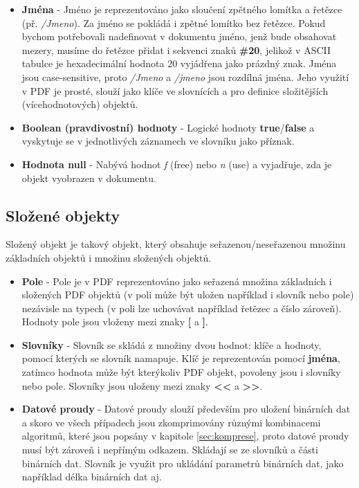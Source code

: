 \begin{itemize}
		\item \textbf{Jména} - Jméno je reprezentováno jako sloučení zpětného lomítka a řetězce (př. \textit{/Jmeno}). Za jméno se pokládá i zpětné lomítko bez řetězce. Pokud bychom potřebovali nadefinovat v dokumentu jméno, jenž bude obsahovat mezery, musíme do řetězce přidat i sekvenci znaků \textbf{\#20}, jelikož v ASCII tabulce je hexadecimální hodnota 20 vyjádřena jako prázdný znak. Jména jsou case-sensitive, proto \textit{/Jmeno} a \textit{/jmeno} jsou rozdílná jména. Jeho využití v PDF je prosté, slouží jako klíče ve slovnících a pro definice složitějších (vícehodnotových) objektů.
		\item \textbf{Boolean (pravdivostní) hodnoty} - Logické hodnoty \textbf{true}/\textbf{false} a vyskytuje se v jednotlivých záznamech ve slovníku jako příznak.
		\item \textbf{Hodnota null} - Nabývá hodnot \textit{f} (free) nebo \textit{n} (use) a vyjadřuje, zda je objekt vyobrazen v dokumentu.
	\end{itemize}
\subsection{Složené objekty}	
Složený objekt je takový objekt, který obsahuje seřazenou/neseřazenou množinu základních objektů i množinu složených objektů.
	\begin{itemize}
		\item \textbf{Pole} - Pole je v PDF reprezentováno jako seřazená množina základních i složených PDF objektů (v poli může být uložen například i slovník nebo pole) nezávisle na typech (v poli lze uchovávat například řetězec a číslo zároveň). Hodnoty pole jsou vloženy mezi znaky \textbf{[} a \textbf{]}.
		\item \textbf{Slovníky} - Slovník se skládá z množiny dvou hodnot: klíče a hodnoty, pomocí kterých se slovník namapuje. Klíč je reprezentován pomocí \textbf{jména}, zatímco hodnota může být kterýkoliv PDF objekt, povoleny jsou i slovníky nebo pole. Slovníky jsou uloženy mezi znaky \textbf{<<} a \textbf{>>}.
		\item \textbf{Datové proudy} - Datové proudy slouží především pro uložení binárních dat a skoro ve všech případech jsou zkomprimovány různými kombinacemi algoritmů, které jsou popsány v kapitole \ref{sec:komprese}, proto datové proudy musí být zároveň i nepřímým odkazem. Skládají se ze slovníků a části binárních dat. Slovník je využit pro ukládání parametrů binárních dat, jako například délka binárních dat aj.
	\end{itemize}
